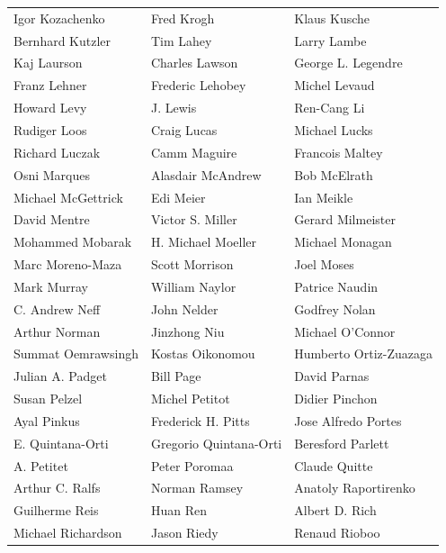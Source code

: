 \begin{tabular}{lll}
Igor Kozachenko        & Fred Krogh             & Klaus Kusche\\
Bernhard Kutzler       & Tim Lahey              & Larry Lambe\\
Kaj Laurson            & Charles Lawson         & George L. Legendre\\
Franz Lehner           & Frederic Lehobey       & Michel Levaud\\
Howard Levy            & J. Lewis               & Ren-Cang Li\\
Rudiger Loos           & Craig Lucas            & Michael Lucks\\
Richard Luczak         & Camm Maguire           & Francois Maltey\\
Osni Marques           & Alasdair McAndrew      & Bob McElrath\\
Michael McGettrick     & Edi Meier              & Ian Meikle\\
David Mentre           & Victor S. Miller       & Gerard Milmeister\\
Mohammed Mobarak       & H. Michael Moeller     & Michael Monagan\\
Marc Moreno-Maza       & Scott Morrison         & Joel Moses\\
Mark Murray            & William Naylor         & Patrice Naudin\\
C. Andrew Neff         & John Nelder            & Godfrey Nolan\\
Arthur Norman          & Jinzhong Niu           & Michael O'Connor\\
Summat Oemrawsingh     & Kostas Oikonomou       & Humberto Ortiz-Zuazaga\\
Julian A. Padget       & Bill Page              & David Parnas\\
Susan Pelzel           & Michel Petitot         & Didier Pinchon\\
Ayal Pinkus            & Frederick H. Pitts     & Jose Alfredo Portes\\
E. Quintana-Orti       & Gregorio Quintana-Orti & Beresford Parlett\\
A. Petitet             & Peter Poromaa          & Claude Quitte\\
Arthur C. Ralfs        & Norman Ramsey          & Anatoly Raportirenko\\
Guilherme Reis         & Huan Ren               & Albert D. Rich\\
Michael Richardson     & Jason Riedy            & Renaud Rioboo\\

\end{tabular}
